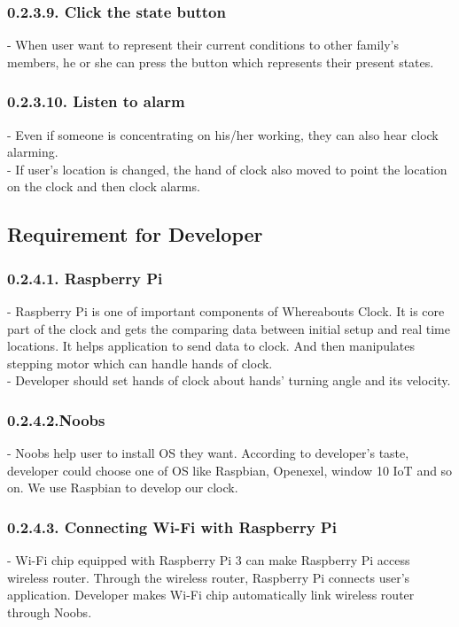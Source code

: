 \documentclass[10pt,a4paper,twocolumn]{report}
\begin{document}
     	\subsubsection{0.2.3.9. Click the state button }
     	- When user want to represent their current conditions to other family’s members, he or she can 		  press the button which represents their present states. \\
     	
     	\subsubsection{0.2.3.10. Listen to alarm}
     	- Even if someone is concentrating on his/her working, they can also hear clock alarming.\\
		- If user’s location is changed, the hand of clock also moved to point the location on the  
		  clock and then clock alarms. \\
	\subsection{Requirement for Developer}
		\subsubsection{0.2.4.1. Raspberry Pi}
		- Raspberry Pi is one of important components of Whereabouts Clock. It is core part of the clock and gets the comparing data between initial setup and real time locations. It helps application to send data to clock. And then manipulates stepping motor which can handle hands of clock.\\
- Developer should set hands of clock about hands' turning angle and its velocity.\\

		\subsubsection{0.2.4.2.Noobs}
		- Noobs help user to install OS they want. According to developer’s taste, developer could choose one of OS like Raspbian, Openexel, window 10 IoT and so on. We use Raspbian to develop our clock.\\
		
		\subsubsection{0.2.4.3. Connecting Wi-Fi with Raspberry Pi}
		- Wi-Fi chip equipped with Raspberry Pi 3 can make Raspberry Pi access wireless router. Through the wireless router, Raspberry Pi connects user’s application. Developer makes Wi-Fi chip automatically link wireless router through Noobs.\\
		
\end{document}
